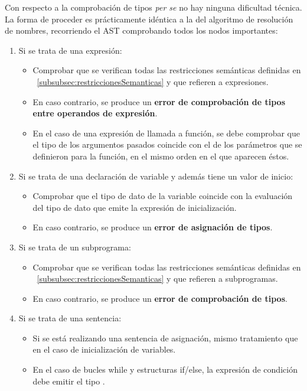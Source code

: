 Con respecto a la comprobación de tipos \textit{per se} no hay ninguna dificultad técnica. La forma de proceder es prácticamente idéntica a la del algoritmo de resolución de nombres, recorriendo el AST comprobando todos los nodos importantes:

\begin{enumerate}
    \item Si se trata de una expresión:
    \begin{itemize}
        \item Comprobar que se verifican todas las restricciones semánticas definidas en ~\ref{subsubsec:restriccionesSemanticas} y que refieren a expresiones.
        \item En caso contrario, se produce un \textbf{error de comprobación de tipos entre operandos de expresión}.
        \item En el caso de una expresión de llamada a función, se debe comprobar que el tipo de los argumentos pasados coincide con el de los parámetros que se definieron para la función, en el mismo orden en el que aparecen éstos.
    \end{itemize}
    \item Si se trata de una declaración de variable y además tiene un valor de inicio:
    \begin{itemize}
        \item Comprobar que el tipo de dato de la variable coincide con la evaluación del tipo de dato que emite la expresión de inicialización.
        \item En caso contrario, se produce un \textbf{error de asignación de tipos}.
    \end{itemize}
    \item Si se trata de un subprograma:
    \begin{itemize}
        \item Comprobar que se verifican todas las restricciones semánticas definidas en ~\ref{subsubsec:restriccionesSemanticas} y que refieren a subprogramas.
        \item En caso contrario, se produce un \textbf{error de comprobación de tipos}.
    \end{itemize}
    \item Si se trata de una sentencia:
    \begin{itemize}
        \item Si se está realizando una sentencia de asignación, mismo tratamiento que en el caso de inicialización de variables.
        \item En el caso de bucles while y estructuras if/else, la expresión de condición debe emitir el tipo .

\end{itemize}
\end{enumerate}
